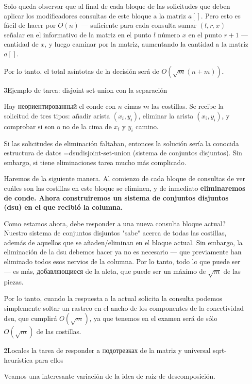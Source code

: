 Solo queda observar que al final de cada bloque de las solicitudes que deben aplicar los modificadores consultas de este bloque a la matriz $a[]$. Pero esto es fácil de hacer por $O(n)$ --- suficiente para cada consulta sumar $(l,r,x)$ señalar en el informativo de la matriz en el punto $l$ número $x$ en el punto $r+1$ --- cantidad de $x$, y luego caminar por la matriz, aumentando la cantidad a la matriz $a[]$.

Por lo tanto, el total asíntotas de la decisión será de $O (\sqrt{m} (n + m))$.


\h3{Ejemplo de tarea: disjoint-set-union con la separación}

Hay неориентированный el conde con $n$ cimas $m$ las costillas. Se recibe la solicitud de tres tipos: añadir arista $(x_i,y_i)$, eliminar la arista $(x_i,y_i)$, y comprobar si son o no de la cima de $x_i$ y $y_i$ camino.

Si las solicitudes de eliminación faltaban, entonces la solución sería la conocida estructura de datos \algohref=dsu{disjoint-set-union (sistema de conjuntos disjuntos)}. Sin embargo, si tiene eliminaciones tarea mucho más complicado.

Haremos de la siguiente manera. Al comienzo de cada bloque de consultas de ver cuáles son las costillas en este bloque se eliminen, y de inmediato \bf{eliminaremos} de conde. Ahora construiremos un sistema de conjuntos disjuntos (dsu) en el que recibió la columna.

Como estamos ahora, debe responder a una nueva consulta bloque actual? Nuestro sistema de conjuntos disjuntos "sabe" acerca de todas las costillas, además de aquellos que se añaden/eliminan en el bloque actual. Sin embargo, la eliminación de la dsu debemos hacer ya no es necesario --- que previamente han eliminado todos esos nervios de la columna. Por lo tanto, todo lo que puede ser --- es más, добавляющиеся de la aleta, que puede ser un máximo de $\sqrt{m}$ de las piezas.

Por lo tanto, cuando la respuesta a la actual solicita la consulta podemos simplemente soltar un rastreo en el ancho de los componentes de la conectividad dsu, que cumplirá $O(\sqrt{m})$, ya que tenemos en el examen será de sólo $O(\sqrt{m})$ de las costillas.



\h2{Locales la tarea de responder a подотрезках de la matriz y universal sqrt-heurística para ellos}

Veamos una interesante variación de la idea de raiz-de descomposición.

